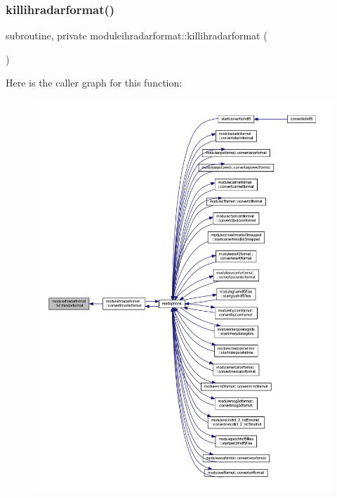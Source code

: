 \subsubsection{\texorpdfstring{killihradarformat()}{killihradarformat()}}
{\footnotesize\ttfamily subroutine, private moduleihradarformat\+::killihradarformat (\begin{DoxyParamCaption}{ }\end{DoxyParamCaption})\hspace{0.3cm}{\ttfamily [private]}}

Here is the caller graph for this function\+:\nopagebreak
\begin{figure}[H]
\begin{center}
\leavevmode
\includegraphics[width=350pt]{namespacemoduleihradarformat_af1f8f7e2cf6ebd67fd284bbb39a55018_icgraph}
\end{center}
\end{figure}
\mbox{\label{namespacemoduleihradarformat_a3b96dd949bf780f8b1d2d5d3818dda48}} 
